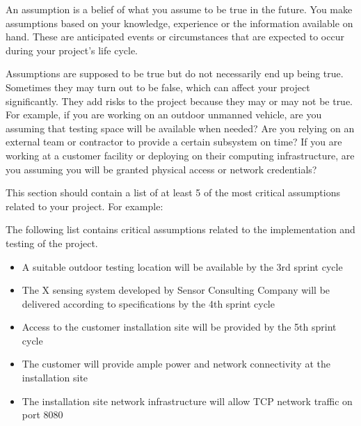 An assumption is a belief of what you assume to be true in the future. You make assumptions based on your knowledge, experience or the information available on hand. These are anticipated events or circumstances that are expected to occur during your project's life cycle.

Assumptions are supposed to be true but do not necessarily end up being true. Sometimes they may turn out to be false, which can affect your project significantly. They add risks to the project because they may or may not be true. For example, if you are working on an outdoor unmanned vehicle, are you assuming that testing space will be available when needed? Are you relying on an external team or contractor to provide a certain subsystem on time? If you are working at a customer facility or deploying on their computing infrastructure, are you assuming you will be granted physical access or network credentials?

This section should contain a list of at least 5 of the most critical assumptions related to your project. For example:

The following list contains critical assumptions related to the implementation and testing of the project.

\begin{itemize}
  \item A suitable outdoor testing location will be available by the 3rd sprint cycle
  \item The X sensing system developed by Sensor Consulting Company will be delivered according to specifications by the 4th sprint cycle
  \item Access to the customer installation site will be provided by the 5th sprint cycle
  \item The customer will provide ample power and network connectivity at the installation site
  \item The installation site network infrastructure will allow TCP network traffic on port 8080
\end{itemize}